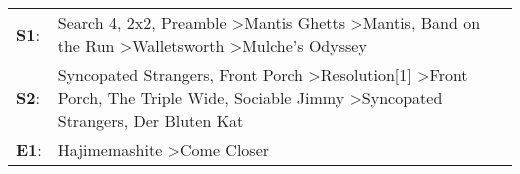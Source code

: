\begin{supertabular}{p{0.03\textwidth}p{0.92\textwidth}}
 \textbf{S1}:  &                           Search 4\textsuperscript{}, \enspace 2x2\textsuperscript{}, \enspace Preamble\textsuperscript{} \textgreater \enspace Mantis Ghetts\textsuperscript{} \textgreater \enspace Mantis\textsuperscript{}, \enspace Band on the Run\textsuperscript{} \textgreater \enspace Walletsworth\textsuperscript{} \textgreater \enspace Mulche's Odyssey\textsuperscript{}  \enspace  \\
 \textbf{S2}:  &  Syncopated Strangers\textsuperscript{}, \enspace Front Porch\textsuperscript{} \textgreater \enspace Resolution[1]\textsuperscript{} \textgreater \enspace Front Porch\textsuperscript{}, \enspace The Triple Wide\textsuperscript{}, \enspace Sociable Jimmy\textsuperscript{} \textgreater \enspace Syncopated Strangers\textsuperscript{}, \enspace Der Bluten Kat\textsuperscript{}  \enspace  \\
 \textbf{E1}:  &                                                                                                                                                                                                                                                                                                      Hajimemashite\textsuperscript{} \textgreater \enspace Come Closer\textsuperscript{}  \enspace  \\
\end{supertabular}
